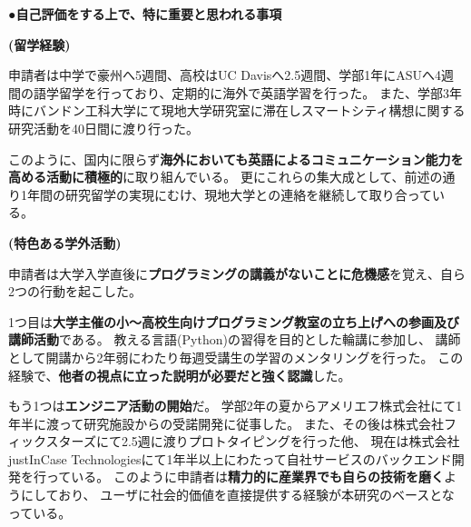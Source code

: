 {\noindent
●\textbf{自己評価をする上で、特に重要と思われる事項}

%

\textbf{(留学経験)}

申請者は中学で豪州へ5週間、高校はUC Davisへ2.5週間、学部1年にASUへ4週間の語学留学を行っており、定期的に海外で英語学習を行った。
また、学部3年時にバンドン工科大学にて現地大学研究室に滞在しスマートシティ構想に関する研究活動を40日間に渡り行った。

このように、国内に限らず\textbf{海外においても英語によるコミュニケーション能力を高める活動に積極的}に取り組んでいる。
更にこれらの集大成として、前述の通り1年間の研究留学の実現にむけ、現地大学との連絡を継続して取り合っている。

\textbf{(特色ある学外活動)}

申請者は大学入学直後に\textbf{プログラミングの講義がないことに危機感}を覚え、自ら2つの行動を起こした。

1つ目は\textbf{大学主催の小〜高校生向けプログラミング教室の立ち上げへの参画及び講師活動}\cite{uecprog}である。
教える言語(Python)の習得を目的とした輪講に参加し、
講師として開講から2年弱にわたり毎週受講生の学習のメンタリングを行った。
この経験で、\textbf{他者の視点に立った説明が必要だと強く認識}した。

もう1つは\textbf{エンジニア活動の開始}だ。
学部2年の夏からアメリエフ株式会社にて1年半に渡って研究施設からの受諾開発に従事した\cite{amelieff}。
また、その後は株式会社フィックスターズにて2.5週に渡りプロトタイピングを行った他、
現在は株式会社justInCase Technologiesにて1年半以上にわたって自社サービスのバックエンド開発を行っている\cite{jic-tech}。
このように申請者は\textbf{精力的に産業界でも自らの技術を磨く}ようにしており、
ユーザに社会的価値を直接提供する経験が本研究のベースとなっている。

}
